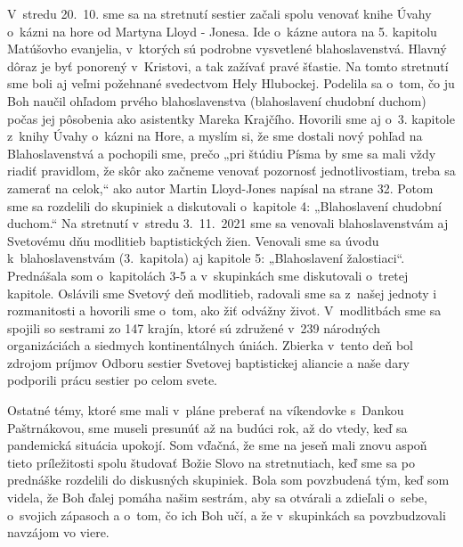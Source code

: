 V~stredu 20.~10. sme sa na stretnutí sestier začali spolu venovať knihe Úvahy o~kázni na hore od Martyna Lloyd - Jonesa. Ide o~kázne autora na 5. kapitolu Matúšovho evanjelia, v~ktorých sú podrobne vysvetlené blahoslavenstvá. Hlavný dôraz je byť ponorený v~Kristovi, a tak zažívať pravé šťastie. Na tomto stretnutí sme boli aj veľmi požehnané svedectvom Hely Hlubockej. Podelila sa o~tom, čo ju Boh naučil ohľadom prvého blahoslavenstva (blahoslavení chudobní duchom) počas jej pôsobenia ako asistentky Mareka Krajčího. Hovorili sme aj o~3. kapitole z~knihy Úvahy o~kázni na Hore, a myslím si, že sme dostali nový pohľad na Blahoslavenstvá a pochopili sme, prečo „pri štúdiu Písma by sme sa mali vždy riadiť pravidlom, že skôr ako začneme venovať pozornosť jednotlivostiam, treba sa zamerať na celok,“ ako autor Martin Lloyd-Jones napísal na strane 32. Potom sme sa rozdelili do skupiniek a diskutovali o~kapitole 4: „Blahoslavení chudobní duchom.“
Na stretnutí v~stredu 3.~11.~2021 sme sa venovali blahoslavenstvám aj Svetovému dňu modlitieb baptistických žien. Venovali sme sa úvodu k~blahoslavenstvám (3.~kapitola) aj kapitole 5: „Blahoslavení žalostiaci“. Prednášala som o~kapitolách 3-5 a v~skupinkách sme diskutovali o~tretej kapitole. Oslávili sme Svetový deň modlitieb, radovali sme sa z~našej jednoty i rozmanitosti a hovorili sme o~tom, ako žiť odvážny život. V~modlitbách sme sa spojili so sestrami zo 147 krajín, ktoré sú združené v~239 národných organizáciách a siedmych kontinentálnych úniách. Zbierka v~tento deň bol zdrojom príjmov Odboru sestier Svetovej baptistickej aliancie a naše dary podporili prácu sestier po celom svete.

Ostatné témy, ktoré sme mali v~pláne preberať na víkendovke s~Dankou Paštrnákovou, sme museli presunúť až na budúci rok, až do vtedy, keď sa pandemická situácia upokojí.
Som vďačná, že sme na jeseň mali znovu aspoň tieto príležitosti spolu študovať Božie Slovo na stretnutiach, keď sme sa po prednáške rozdelili do diskusných skupiniek. Bola som povzbudená tým, keď som videla, že Boh ďalej pomáha našim sestrám, aby sa otvárali a zdieľali o~sebe, o~svojich zápasoch a o~tom, čo ich Boh učí, a že v~skupinkách sa povzbudzovali navzájom vo viere.



